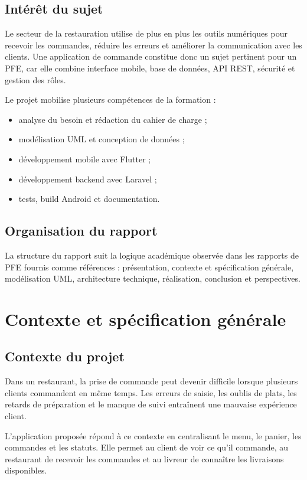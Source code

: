 \documentclass[12pt,a4paper]{report}
\begin{document}
\section{Intérêt du sujet}
Le secteur de la restauration utilise de plus en plus les outils numériques pour recevoir les commandes, réduire les erreurs et améliorer la communication avec les clients. Une application de commande constitue donc un sujet pertinent pour un PFE, car elle combine interface mobile, base de données, API REST, sécurité et gestion des rôles.

Le projet mobilise plusieurs compétences de la formation :
\begin{itemize}
  \item analyse du besoin et rédaction du cahier de charge ;
  \item modélisation UML et conception de données ;
  \item développement mobile avec Flutter ;
  \item développement backend avec Laravel ;
  \item tests, build Android et documentation.
\end{itemize}

\section{Organisation du rapport}
La structure du rapport suit la logique académique observée dans les rapports de PFE fournis comme références : présentation, contexte et spécification générale, modélisation UML, architecture technique, réalisation, conclusion et perspectives.

\chapter{Contexte et spécification générale}
\section{Contexte du projet}
Dans un restaurant, la prise de commande peut devenir difficile lorsque plusieurs clients commandent en même temps. Les erreurs de saisie, les oublis de plats, les retards de préparation et le manque de suivi entraînent une mauvaise expérience client.

L'application proposée répond à ce contexte en centralisant le menu, le panier, les commandes et les statuts. Elle permet au client de voir ce qu'il commande, au restaurant de recevoir les commandes et au livreur de connaître les livraisons disponibles.
\end{document}
